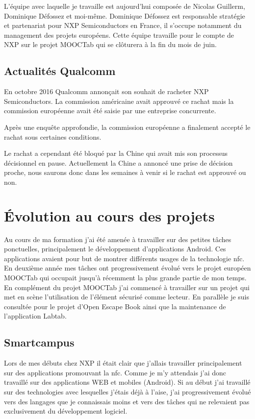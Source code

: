 \documentclass[french,12pt,a4paper,titlepage,openright,openbib]{report}
\begin{document}
L'équipe avec laquelle je travaille est aujourd'hui composée de Nicolas Guillerm, Dominique Défossez et moi-même. Dominique Défossez est responsable stratégie et partenariat pour NXP Semiconductors en France, il s'occupe notamment du management des projets européens.
Cette équipe travaille pour le compte de NXP sur le projet MOOCTab qui se clôturera à la fin du mois de juin.

\section{Actualités Qualcomm}
En octobre 2016 Qualcomm annonçait son souhait de racheter NXP Semiconductors. La commission américaine avait approuvé ce rachat mais la commission européenne avait été saisie par une entreprise concurrente.

Après une enquête approfondie, la commission européenne a finalement accepté le rachat sous certaines conditions.

Le rachat a cependant été bloqué par la Chine qui avait mis son processus décisionnel en pause. Actuellement la Chine a annoncé une prise de décision proche, nous saurons donc dans les semaines à venir si le rachat est approuvé ou non.



\chapter{Évolution au cours des projets}

Au cours de ma formation j'ai été amenée à travailler sur des petites tâches ponctuelles, principalement le développement d'applications Android. Ces applications avaient pour but de montrer différents usages de la technologie \gls{nfc}.
En deuxième année mes tâches ont progressivement évolué vers le projet européen MOOCTab qui occupait jusqu'à récemment la plus grande partie de mon temps.
En complément du projet MOOCTab j'ai commencé à travailler sur un projet qui met en scène l'utilisation de l'élément sécurisé comme lecteur.
En parallèle je suis consultée pour le projet d'Open Escape Book ainsi que la maintenance de l'application Labtab.

\section{Smartcampus}

Lors de mes débuts chez NXP il était clair que j'allais travailler principalement sur des applications promouvant la \gls{nfc}. Comme je m'y attendais j'ai donc travaillé sur des applications WEB et mobiles (Android).
Si au début j'ai travaillé sur des technologies avec lesquelles j'étais déjà à l'aise, j'ai progressivement évolué vers des langages que je connaissais moins et vers des tâches qui ne relevaient pas exclusivement du développement logiciel.
\end{document}
